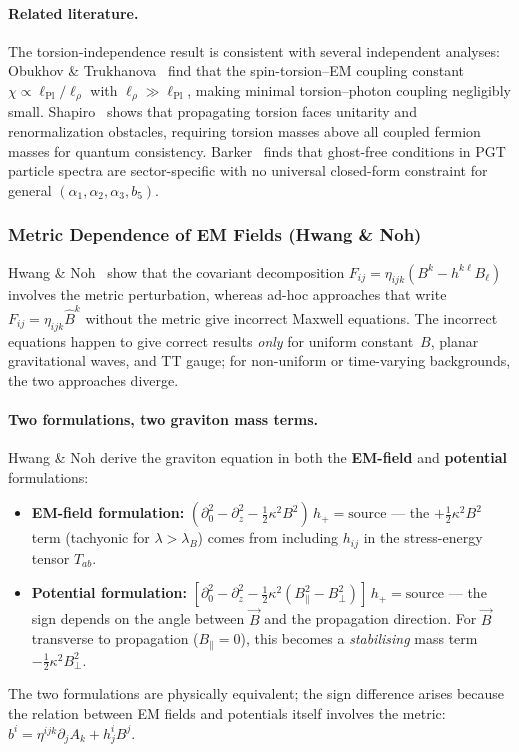 \paragraph{Related literature.}
The torsion-independence result is consistent with several independent analyses:
Obukhov \& Trukhanova~\cite{obukhov2024electrodynamics} find that the spin-torsion--EM
coupling constant $\chi \propto \ell_\mathrm{Pl}/\ell_\rho$ with $\ell_\rho \gg
\ell_\mathrm{Pl}$, making minimal torsion--photon coupling negligibly small.
Shapiro~\cite{shapiro2002torsion} shows that propagating torsion faces unitarity and
renormalization obstacles, requiring torsion masses above all coupled fermion masses for
quantum consistency.
Barker~\cite{barker2024poincare} finds that ghost-free conditions in PGT particle
spectra are sector-specific with no universal closed-form constraint for general
$(\alpha_1, \alpha_2, \alpha_3, b_5)$.

\subsubsection{Metric Dependence of EM Fields (Hwang \& Noh)}
\label{subsec:hwang-noh}

Hwang \& Noh~\cite{hwangnoh2023graviton} show that the covariant decomposition
$F_{ij} = \eta_{ijk}(B^k - h^{k\ell}B_\ell)$ involves the metric perturbation, whereas
ad-hoc approaches that write $F_{ij} = \eta_{ijk}\hat{B}^k$ without the metric give
incorrect Maxwell equations.  The incorrect equations happen to give correct results
\emph{only} for uniform constant~$B$, planar gravitational waves, and TT gauge; for
non-uniform or time-varying backgrounds, the two approaches diverge.

\paragraph{Two formulations, two graviton mass terms.}
Hwang \& Noh derive the graviton equation in both the \textbf{EM-field} and
\textbf{potential} formulations:
\begin{itemize}
  \item \textbf{EM-field formulation:} $(\partial_0^2 - \partial_z^2 - \tfrac{1}{2}\kappa^2 B^2)\,h_+ = \text{source}$
    --- the $+\tfrac{1}{2}\kappa^2 B^2$ term (tachyonic for $\lambda > \lambda_B$)
    comes from including $h_{ij}$ in the stress-energy tensor $T_{ab}$.
  \item \textbf{Potential formulation:}
    $[\partial_0^2 - \partial_z^2 - \tfrac{1}{2}\kappa^2(B_\parallel^2 - B_\perp^2)]\,h_+ = \text{source}$
    --- the sign depends on the angle between $\vec{B}$ and the propagation direction.
    For $\vec{B}$ transverse to propagation ($B_\parallel = 0$), this becomes a
    \emph{stabilising} mass term $-\tfrac{1}{2}\kappa^2 B_\perp^2$.
\end{itemize}
The two formulations are physically equivalent; the sign difference arises because the
relation between EM fields and potentials itself involves the metric:
$b^i = \eta^{ijk}\partial_j A_k + h^i_j B^j$.

